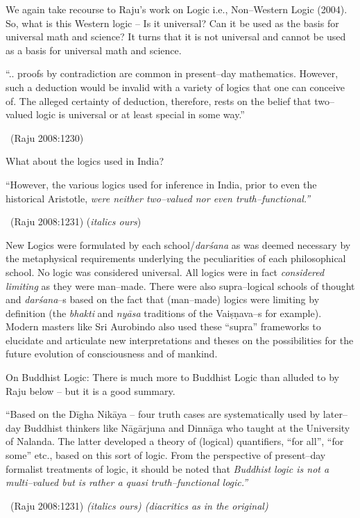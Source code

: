We again take recourse to Raju’s work on Logic i.e., Non–Western Logic (2004). So, what is this Western logic – Is it universal? Can it be used as the basis for universal math and science? It turns that it is not universal and cannot be used as a basis for universal math and science.

\begin{myquote}
“.. proofs by contradiction are common in present–day mathematics. However, such a deduction would be invalid with a variety of logics that one can conceive of. The alleged certainty of deduction, therefore, rests on the belief that two–valued logic is universal or at least special in some way.” 

~\hfill (Raju 2008:1230)
\end{myquote}

What about the logics used in India?

\begin{myquote}
“However, the various logics used for inference in India, prior to even the historical Aristotle, \textit{were neither two–valued nor even truth–functional.”} 

~\hfill (Raju 2008:1231) (\textit{italics ours})
\end{myquote}

New Logics were formulated by each school/\textit{darśana} as was deemed necessary by the metaphysical requirements underlying the peculiarities of each philosophical school. No logic was considered universal. All logics were in fact \textit{considered limiting} as they were man–made. There were also supra–logical schools of thought and \textit{darśana}–s based on the fact that (man–made) logics were limiting by definition (the \textit{bhakti} and \textit{nyāsa} traditions of the Vaiṣṇava–s for example). Modern masters like Sri Aurobindo also used these “supra” frameworks to elucidate and articulate new interpretations and theses on the possibilities for the future evolution of consciousness and of mankind.

On Buddhist Logic: There is much more to Buddhist Logic than alluded to by Raju below – but it is a good summary.

\begin{myquote}
“Based on the Dīgha Nikāya – four truth cases are systematically used by later–day Buddhist thinkers like Nāgārjuna and Dinnāga who taught at the University of Nalanda. The latter developed a theory of (logical) quantifiers, “for all”, “for some” etc., based on this sort of logic. From the perspective of present–day formalist treatments of logic, it should be noted that \textit{Buddhist logic is not a multi–valued but is rather a quasi truth–functional logic.”}

~\hfill (Raju 2008:1231) \textit{(italics ours) (diacritics as in the original)}
\end{myquote}

